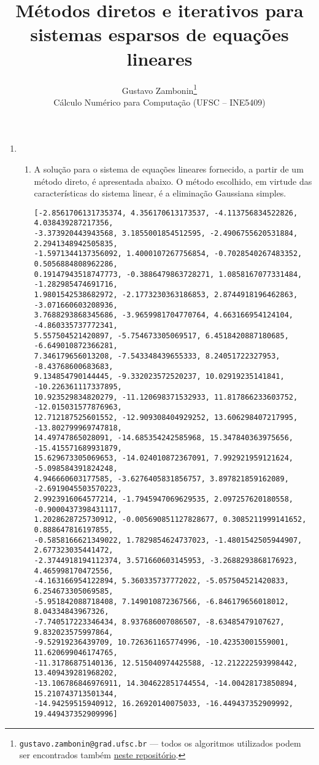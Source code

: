 \documentclass{article}
\title{\textbf{Métodos diretos e iterativos
para sistemas esparsos de equações lineares}}
\author{Gustavo Zambonin\thanks{\texttt{gustavo.zambonin@grad.ufsc.br} ---
todos os algoritmos utilizados podem ser encontrados
também \href{https://github.com/zambonin/ufsc-ine5409}{neste repositório}.} \\
\small {Cálculo Numérico para Computação (UFSC -- INE5409)} \vspace{-5mm}}
\date{}
\newenvironment{arabenum}{
    \begin{enumerate}[label=\textbf{\arabic*})]
}{
    \end{enumerate}
}
\newenvironment{alphenum}{
    \begin{enumerate}[label=(\textit{\alph*})]
}{
    \end{enumerate}
}
\begin{document}
\maketitle

\begin{arabenum}

\item \begin{alphenum}

\item A solução para o sistema de equações lineares fornecido, a partir de um
método direto, é apresentada abaixo. O método escolhido, em virtude das
características do sistema linear, é a eliminação Gaussiana simples.

\begin{verbatim}
[-2.8561706131735374, 4.356170613173537, -4.113756834522826, 4.038439287217356,
-3.373920443943568, 3.1855001854512595, -2.4906755620531884, 2.2941348942505835,
-1.5971344137356092, 1.4000107267756854, -0.7028540267483352, 0.5056884808962286,
0.19147943518747773, -0.3886479863728271, 1.0858167077331484, -1.282985474691716,
1.9801542538682972, -2.1773230363186853, 2.8744918196462863, -3.071660603208936,
3.7688293868345686, -3.9659981704770764, 4.663166954124104, -4.860335737772341,
5.557504521420897, -5.754673305069517, 6.4518420887180685, -6.649010872366281,
7.346179656013208, -7.543348439655333, 8.24051722327953, -8.43768600683683,
9.134854790144445, -9.332023572520237, 10.02919235141841, -10.226361117337895,
10.923529834820279, -11.120698371532933, 11.817866233603752, -12.015031577876963,
12.712187525601552, -12.909308404929252, 13.606298407217995, -13.802799969747818,
14.49747865028091, -14.685354242585968, 15.347840363975656, -15.415571689931879,
15.629673305069653, -14.024010872367091, 7.992921959121624, -5.098584391824248,
4.946660603177585, -3.6276405831856757, 3.897821859162089, -2.6919045503570223,
2.9923916064577214, -1.7945947069629535, 2.097257620180558, -0.9000437398431117,
1.2028628725730912, -0.005690851127828677, 0.3085211999141652, 0.888647816197855,
-0.5858166621349022, 1.7829854624737023, -1.4801542505944907, 2.677323035441472,
-2.3744918194112374, 3.571660603145953, -3.2688293868176923, 4.465998170472556,
-4.163166954122894, 5.360335737772022, -5.057504521420833, 6.254673305069585,
-5.951842088718408, 7.149010872367566, -6.846179656018012, 8.04334843967326,
-7.740517223346434, 8.937686007086507, -8.63485479107627, 9.832023575997864,
-9.52919236439709, 10.726361165774996, -10.42353001559001, 11.620699046174765,
-11.31786875140136, 12.515040974425588, -12.212222593998442, 13.409439281968202,
-13.106786846976911, 14.304622851744554, -14.00428173850894, 15.210743713501344,
-14.94259515940912, 16.26920140075033, -16.449437352909992, 19.449437352909996]
\end{verbatim}


\end{alphenum}
\end{arabenum}
\end{document}

